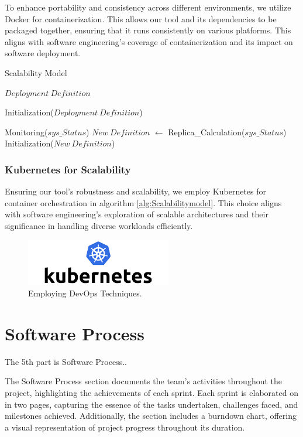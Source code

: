 \documentclass[journal]{IEEEtran}
\begin{document}
To enhance portability and consistency across different environments, we utilize Docker for containerization. This allows our tool and its dependencies to be packaged together, ensuring that it runs consistently on various platforms. This aligns with software engineering's coverage of containerization and its impact on software deployment.

\begin{algorithm}[hbt!]
    \caption{Scalability Model}\label{alg:Scalabilitymodel}
    \begin{algorithmic}
    
    \Require $Deployment\ Definition$
  
    \State Initialization($Deployment\ Definition$) 

    \Repeat
        \State Monitoring($sys\_Status$)
        \State $New\ Definition$ $\gets$ Replica\_Calculation($sys\_Status$)
        \State Initialization($New\ Definition$) 
    
    \end{algorithmic}
  \end{algorithm}

\subsubsection{Kubernetes for Scalability}

Ensuring our tool's robustness and scalability, we employ Kubernetes for container orchestration in algorithm \ref{alg:Scalabilitymodel}. This choice aligns with software engineering's exploration of scalable architectures and their significance in handling diverse workloads efficiently.

\begin{figure}[!t]
\centering
\includegraphics[width=2.5in]{figures/k8slogo.png}
\caption{Employing DevOps Techniques.}
\label{fig:k8slogo}
\end{figure}


\section{Software Process}
\noindent The 5th part is Software Process..

The Software Process section documents the team's activities throughout the project, highlighting the achievements of each sprint. Each sprint is elaborated on in two pages, capturing the essence of the tasks undertaken, challenges faced, and milestones achieved. Additionally, the section includes a burndown chart, offering a visual representation of project progress throughout its duration.
\end{document}
